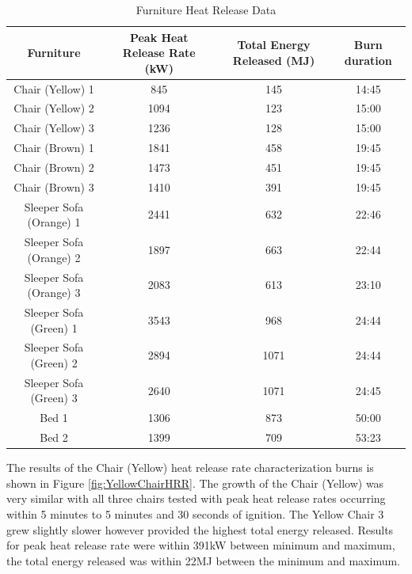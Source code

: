 \documentclass{article}
\begin{document}
\begin{table}[H]
	\caption{Furniture Heat Release Data}
	\begin{tabular}{|c|c|c|c|}
		\hline
		Furniture & Peak Heat Release Rate (kW) & Total Energy Released (MJ) & Burn duration \\ \hline \hline
		Chair (Yellow) 1 & 845 & 145 & 14:45 \\ \hline
		Chair (Yellow) 2 & 1094 & 123 & 15:00 \\ \hline
		Chair (Yellow) 3 & 1236 & 128 & 15:00 \\ \hline
		Chair (Brown) 1 & 1841 & 458 & 19:45 \\ \hline
		Chair (Brown) 2 & 1473 & 451 & 19:45 \\ \hline
		Chair (Brown) 3 & 1410 & 391 & 19:45 \\ \hline
		Sleeper Sofa (Orange) 1  & 2441 & 632 & 22:46 \\ \hline
		Sleeper Sofa (Orange) 2  & 1897 & 663 & 22:44 \\ \hline
		Sleeper Sofa (Orange) 3  & 2083 & 613 & 23:10 \\ \hline
		Sleeper Sofa (Green) 1  & 3543 & 968 & 24:44 \\ \hline
		Sleeper Sofa (Green) 2  & 2894 & 1071 & 24:44 \\ \hline
		Sleeper Sofa (Green) 3  & 2640 & 1071 & 24:45 \\ \hline
		Bed 1 & 1306 & 873 & 50:00 \\ \hline
		Bed 2 & 1399 & 709 & 53:23 \\ \hline
	\end{tabular}
	\label{table:FurnitureHRR_Data}
\end{table}

\clearpage

The results of the Chair (Yellow) heat release rate characterization burns is shown in Figure \ref{fig:YellowChairHRR}. The growth of the Chair (Yellow) was very similar with all three chairs tested with peak heat release rates occurring within 5 minutes to 5 minutes and 30 seconds of ignition. The Yellow Chair 3 grew slightly slower however provided the highest total energy released. Results for peak heat release rate were within 391kW between minimum and maximum, the total energy released was within 22MJ between the minimum and maximum. 
\end{document}
